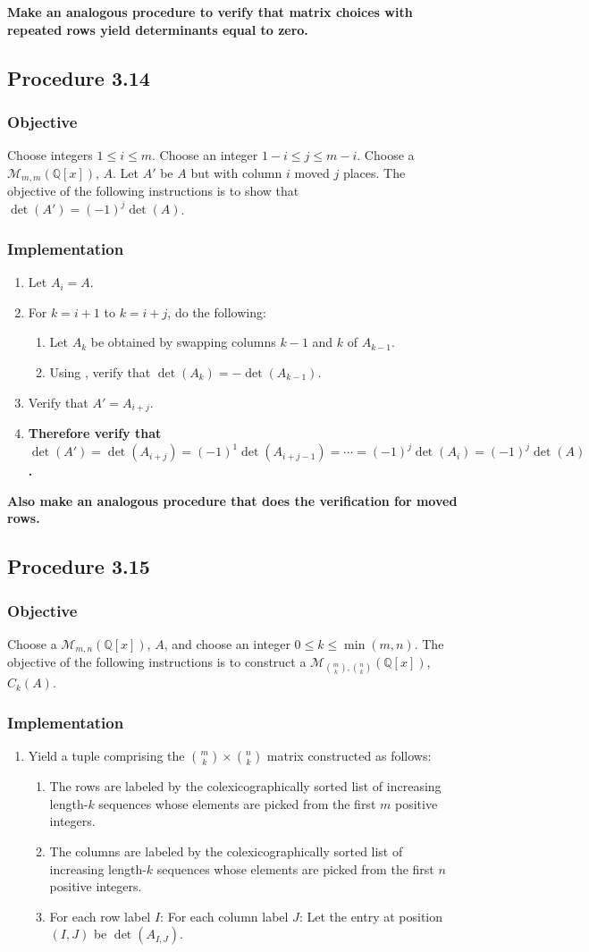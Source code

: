 \documentclass[twocolumn]{article}
\newcommand{\procedure}[2][]{\subsection*{Procedure #2 \ifthenelse{\equal{#1}{}}{}{(#1)}}\label{sec:procedure #2}}
\newcommand{\objective}{\subsubsection*{Objective}}
\newcommand{\implementation}{\subsubsection*{Implementation}}
\newcommand{\procedurehr}[2][]{\hyperref[sec:procedure #2]{\ifthenelse{\equal{#1}{}}{procedure #2}{#1}}}
\begin{document}
			\textbf{Make an analogous procedure to verify that matrix choices with repeated rows yield determinants equal to zero.}
		\procedure{3.14}
			\objective
				Choose integers $1\le i\le m$. Choose an integer $1-i\le j\le m-i$. Choose a $\mathcal{M}_{m,m}(\mathbb{Q}[x])$, $A$. Let $A'$ be $A$ but with column $i$ moved $j$ places. The objective of the following instructions is to show that $\det(A')=(-1)^j\det(A)$.
			\implementation
				\begin{enumerate}
					\item Let $A_i=A$.
					\item For $k=i+1$ to $k=i+j$, do the following:
					\begin{enumerate}
						\item Let $A_k$ be obtained by swapping columns $k-1$ and $k$ of $A_{k-1}$.
						\item Using \procedurehr{3.12}, verify that $\det(A_k)=-\det(A_{k-1})$.
					\end{enumerate}
					\item Verify that $A'=A_{i+j}$.
					\item \textbf{Therefore verify that $\det(A')=\det(A_{i+j})=(-1)^1\det(A_{i+j-1})=\cdots=(-1)^j\det(A_{i})=(-1)^j\det(A)$.}
				\end{enumerate}
			\textbf{Also make an analogous procedure that does the verification for moved rows.}
		\procedure{3.15}
			\objective
				Choose a $\mathcal{M}_{m,n}(\mathbb{Q}[x])$, $A$, and choose an integer $0\le k\le\min(m,n)$. The objective of the following instructions is to construct a $\mathcal{M}_{\binom{m}{k},\binom{n}{k}}(\mathbb{Q}[x])$, $C_k(A)$.
			\implementation
				\begin{enumerate}
					\item Yield a tuple comprising the $\binom{m}{k}\times\binom{n}{k}$ matrix constructed as follows:
					\begin{enumerate}
						\item The rows are labeled by the colexicographically sorted list of increasing length-$k$ sequences whose elements are picked from the first $m$ positive integers.
						\item The columns are labeled by the colexicographically sorted list of increasing length-$k$ sequences whose elements are picked from the first $n$ positive integers.
						\item For each row label $I$: For each column label $J$: Let the entry at position $(I,J)$ be $\det(A_{I,J})$.
					\end{enumerate}
				\end{enumerate}
\end{document}
